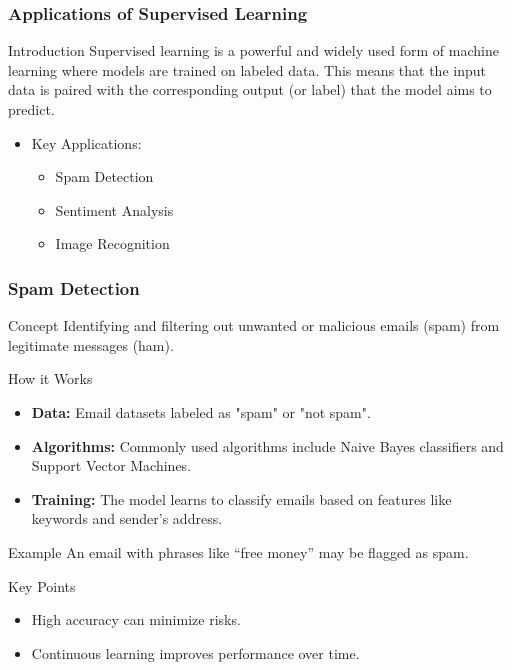 \documentclass[aspectratio=169]{beamer}
\begin{document}
\begin{frame}[fragile]
    \frametitle{Applications of Supervised Learning}
    \begin{block}{Introduction}
        Supervised learning is a powerful and widely used form of machine learning where models are trained on labeled data. This means that the input data is paired with the corresponding output (or label) that the model aims to predict.
    \end{block}
    \begin{itemize}
        \item Key Applications:
        \begin{itemize}
            \item Spam Detection
            \item Sentiment Analysis
            \item Image Recognition
        \end{itemize}
    \end{itemize}
\end{frame}

\begin{frame}[fragile]
    \frametitle{Spam Detection}
    \begin{block}{Concept}
        Identifying and filtering out unwanted or malicious emails (spam) from legitimate messages (ham).
    \end{block}
    \begin{block}{How it Works}
        \begin{itemize}
            \item \textbf{Data:} Email datasets labeled as "spam" or "not spam".
            \item \textbf{Algorithms:} Commonly used algorithms include Naive Bayes classifiers and Support Vector Machines.
            \item \textbf{Training:} The model learns to classify emails based on features like keywords and sender's address.
        \end{itemize}
    \end{block}
    \begin{block}{Example}
        An email with phrases like ``free money'' may be flagged as spam.
    \end{block}
    \begin{block}{Key Points}
        \begin{itemize}
            \item High accuracy can minimize risks.
            \item Continuous learning improves performance over time.
        \end{itemize}
    \end{block}
\end{frame}
\end{document}
